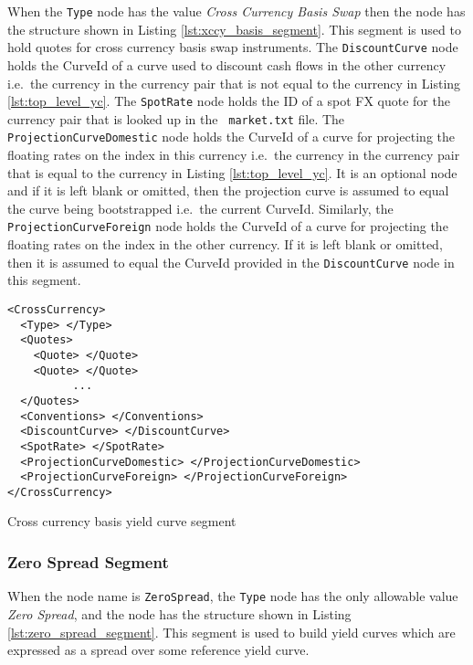 When the \lstinline!Type! node has the value \emph{Cross Currency Basis Swap} then the node has the structure shown in
Listing \ref{lst:xccy_basis_segment}. This segment is used to hold quotes for cross currency basis swap instruments. The
\lstinline!DiscountCurve! node holds the CurveId of a curve used to discount cash flows in the other currency i.e.\ the
currency in the currency pair that is not equal to the currency in Listing \ref{lst:top_level_yc}. The
\lstinline!SpotRate! node holds the ID of a spot FX quote for the currency pair that is looked up in the {\tt
  market.txt} file. The \lstinline!ProjectionCurveDomestic! node holds the CurveId of a curve for projecting the
floating rates on the index in this currency i.e.\ the currency in the currency pair that is equal to the currency in
Listing \ref{lst:top_level_yc}. It is an optional node and if it is left blank or omitted, then the projection curve is
assumed to equal the curve being bootstrapped i.e.\ the current CurveId. Similarly, the
\lstinline!ProjectionCurveForeign! node holds the CurveId of a curve for projecting the floating rates on the index in
the other currency. If it is left blank or omitted, then it is assumed to equal the CurveId provided in the
\lstinline!DiscountCurve! node in this segment.

\begin{listing}[H]
\begin{verbatim}
<CrossCurrency>
  <Type> </Type>
  <Quotes>
    <Quote> </Quote>
    <Quote> </Quote>
          ...
  </Quotes>
  <Conventions> </Conventions>
  <DiscountCurve> </DiscountCurve>
  <SpotRate> </SpotRate>
  <ProjectionCurveDomestic> </ProjectionCurveDomestic>
  <ProjectionCurveForeign> </ProjectionCurveForeign>
</CrossCurrency>
\end{verbatim}
\caption{Cross currency basis yield curve segment}
\label{lst:xccy_basis_segment}
\end{listing}

\subsubsection*{Zero Spread Segment}

When the node name is \lstinline!ZeroSpread!, the \lstinline!Type!
node has the only allowable value \emph{Zero Spread},  and the node has the structure shown in 
Listing \ref{lst:zero_spread_segment}. This segment is used to build yield
curves which are expressed as a spread over some reference yield curve.

